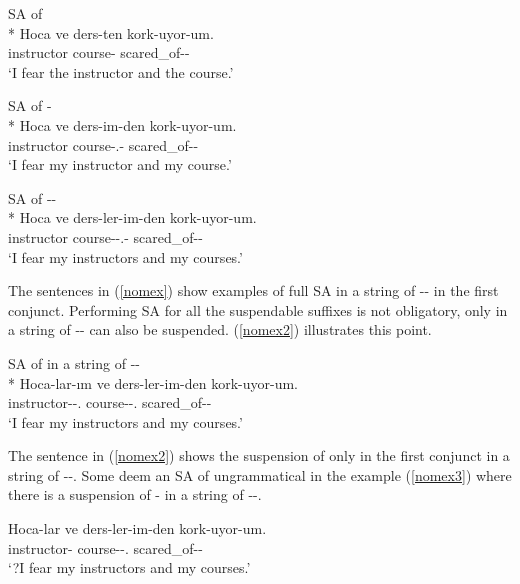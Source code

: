 \begin{exe}
    \ex \label{nomex} 
    \begin{xlist}
        \ex SA of {\Abl}\\*
        \gll Hoca ve ders-ten kork-uyor-um. \\
        instructor {\And} course-{\Abl} scared\_of-{\Prog}-{\Fsg} \\
        \glt `I fear the instructor and the course.'
        
        \ex SA of {\Poss-\Abl}\\*
        \gll Hoca ve ders-im-den kork-uyor-um. \\
        instructor {\And} course-{\Poss}.{\Fsg}-{\Abl} scared\_of-{\Prog}-{\Fsg} \\
        \glt `I fear my instructor and my course.' 
        
        \ex SA of {\Pl-\Poss-\Abl}\\*
        \gll Hoca ve ders-ler-im-den kork-uyor-um. \\ 
        instructor {\And} course-{\Pl}-{\Poss}.{\Fsg}-{\Abl} scared\_of-{\Prog}-{\Fsg} \\
        \glt `I fear my instructors and my courses.'
    \end{xlist}
\end{exe}
The sentences in (\ref{nomex}) show examples of full SA in a string of {\Pl}-{\Poss}-{\Case} in the first conjunct. Performing SA for all the suspendable suffixes is not obligatory, only {\Case} in a string of {\Pl}-{\Poss}-{\Case} can also be suspended. (\ref{nomex2}) illustrates this point.

\begin{exe}
    \ex \label{nomex2} SA of {\Abl} in a string of {\Pl-\Poss-\Abl}\\*
    \gll Hoca-lar-ım ve ders-ler-im-den kork-uyor-um. \\ 
    instructor-{\Pl}-{\Poss}.{\Fsg} {\And} course-{\Pl}-{\Poss}.{\Fsg} scared\_of-{\Prog}-{\Fsg} \\
    \glt `I fear my instructors and my courses.'
\end{exe}
The sentence in (\ref{nomex2}) shows the suspension of only {\Case} in the first conjunct in a string of {\Pl}-{\Poss}-{\Case}. Some deem an SA of {\Poss} ungrammatical in the example (\ref{nomex3}) where there is a suspension of {\Poss}-{\Case} in a string of {\Pl}-{\Poss}-{\Case}.

\begin{exe}
    \ex \label{nomex3}
    \gll Hoca-lar ve ders-ler-im-den kork-uyor-um. \\ 
    instructor-{\Pl} {\And} course-{\Pl}-{\Poss}.{\Fsg} scared\_of-{\Prog}-{\Fsg} \\
    \glt `?I fear my instructors and my courses.'
\end{exe}

